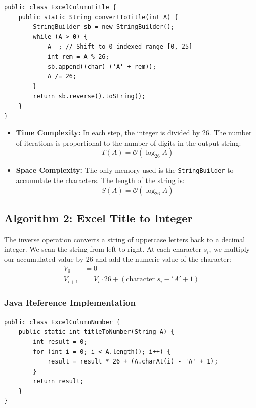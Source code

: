 \documentclass[10pt,journal,compsoc,onecolumn]{IEEEtran}
\begin{document}
\begin{verbatim}
public class ExcelColumnTitle {
    public static String convertToTitle(int A) {
        StringBuilder sb = new StringBuilder();
        while (A > 0) {
            A--; // Shift to 0-indexed range [0, 25]
            int rem = A % 26;
            sb.append((char) ('A' + rem));
            A /= 26;
        }
        return sb.reverse().toString();
    }
}
\end{verbatim}

\begin{itemize}
    \item \textbf{Time Complexity:} In each step, the integer is divided by 26. The number of iterations is proportional to the number of digits in the output string:
    \begin{equation}
    T(A) = \mathcal{O}(\log_{26} A)
    \end{equation}
    \item \textbf{Space Complexity:} The only memory used is the \texttt{StringBuilder} to accumulate the characters. The length of the string is:
    \begin{equation}
    S(A) = \mathcal{O}(\log_{26} A)
    \end{equation}
\end{itemize}

\subsection{Algorithm 2: Excel Title to Integer}

The inverse operation converts a string of uppercase letters back to a decimal integer. We scan the string from left to right. At each character $s_i$, we multiply our accumulated value by 26 and add the numeric value of the character:
\begin{align}
V_0 &= 0 \\
V_{i+1} &= V_i \cdot 26 + (\text{character } s_i - 'A' + 1)
\end{align}

\subsubsection{Java Reference Implementation}

\begin{verbatim}
public class ExcelColumnNumber {
    public static int titleToNumber(String A) {
        int result = 0;
        for (int i = 0; i < A.length(); i++) {
            result = result * 26 + (A.charAt(i) - 'A' + 1);
        }
        return result;
    }
}
\end{verbatim}
\end{document}
